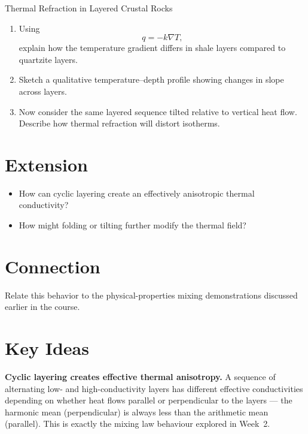 \begin{activity}{Thermal Refraction in Layered Crustal Rocks}
\begin{enumerate}
  \item Using
  \[
    q = -k \nabla T,
  \]
  explain how the temperature gradient differs in shale layers compared to quartzite layers.
  \answerbox[3cm]

  \item Sketch a qualitative temperature--depth profile showing changes in slope across layers.
  \answerbox[5cm]

  \item Now consider the same layered sequence tilted relative to vertical heat flow. Describe how thermal refraction will distort isotherms.
  \answerbox[3cm]
\end{enumerate}

\section*{Extension}
\begin{itemize}
  \item How can cyclic layering create an effectively anisotropic thermal conductivity?
  \answerbox[3cm]
  \item How might folding or tilting further modify the thermal field?
  \answerbox[3cm]
\end{itemize}

\section*{Connection}
Relate this behavior to the physical-properties mixing demonstrations discussed earlier in the course.

\answerbox[3cm]

{\color{red}
\section*{Key Ideas}

{\color{blue}
\textbf{Cyclic layering creates effective thermal anisotropy.} A sequence of alternating low- and high-conductivity layers has different effective conductivities depending on whether heat flows parallel or perpendicular to the layers --- the harmonic mean (perpendicular) is always less than the arithmetic mean (parallel). This is exactly the mixing law behaviour explored in Week~2.

\begin{figure}[h]
\centering
{}
\end{figure}}}
\end{activity}
